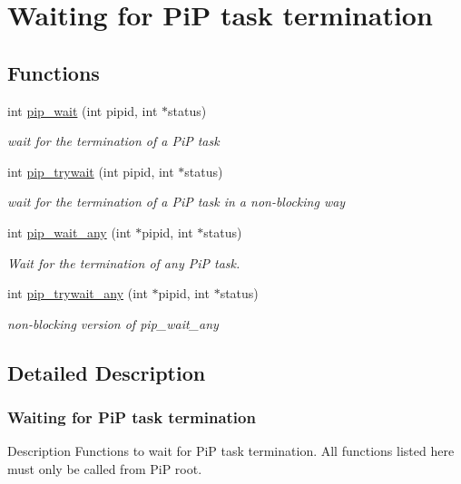\hypertarget{group__PiP-3-wait}{\section{Waiting for Pi\-P task termination}
\label{group__PiP-3-wait}
}
\subsection*{Functions}
\begin{DoxyCompactItemize}
\item 
int \hyperlink{group__PiP-3-wait_gae04520bc29d3ec85d7090f7e645de27d}{pip\-\_\-wait} (int pipid, int $\ast$status)
\begin{DoxyCompactList}\small\item\em wait for the termination of a Pi\-P task \end{DoxyCompactList}\item 
int \hyperlink{group__PiP-3-wait_ga9e786d15401af041842f3f503c962a4b}{pip\-\_\-trywait} (int pipid, int $\ast$status)
\begin{DoxyCompactList}\small\item\em wait for the termination of a Pi\-P task in a non-\/blocking way \end{DoxyCompactList}\item 
int \hyperlink{group__PiP-3-wait_ga621bba73fda6b2bbe3c04e0c65006d36}{pip\-\_\-wait\-\_\-any} (int $\ast$pipid, int $\ast$status)
\begin{DoxyCompactList}\small\item\em Wait for the termination of any Pi\-P task. \end{DoxyCompactList}\item 
int \hyperlink{group__PiP-3-wait_ga697a16f7400d2a2ed2b8ffa230ca83d9}{pip\-\_\-trywait\-\_\-any} (int $\ast$pipid, int $\ast$status)
\begin{DoxyCompactList}\small\item\em non-\/blocking version of {\ttfamily pip\-\_\-wait\-\_\-any} \end{DoxyCompactList}\end{DoxyCompactItemize}


\subsection{Detailed Description}
\hypertarget{pip-wait}{}\subsubsection{Waiting for Pi\-P task termination}\label{pip-wait}
\begin{DoxyParagraph}{Description}
Functions to wait for Pi\-P task termination. All functions listed here must only be called from Pi\-P root. 
\end{DoxyParagraph}


